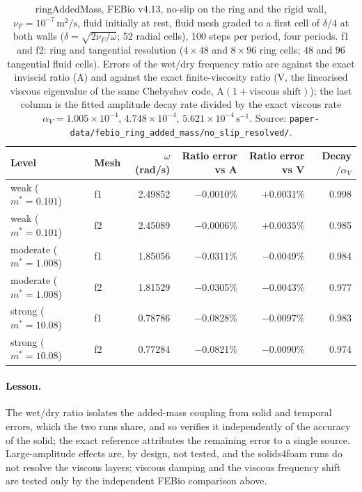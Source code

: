 \begin{table}[htbp]
	\centering
	\small
	\setlength{\tabcolsep}{4pt}
	\caption{ringAddedMass, FEBio v4.13, no-slip on the ring and the rigid wall, $\nu_F=10^{-7}\,\mathrm{m^2/s}$, fluid initially at rest, fluid mesh graded to a first cell of $\delta/4$ at both walls ($\delta=\sqrt{2\nu_F/\omega}$; 52 radial cells), 100 steps per period, four periods. f1 and f2: ring and tangential resolution ($4\times48$ and $8\times96$ ring cells; $48$ and $96$ tangential fluid cells). Errors of the wet/dry frequency ratio are against the exact inviscid ratio (A) and against the exact finite-viscosity ratio (V, the linearised viscous eigenvalue of the same Chebyshev code, $\mathrm{A}(1+\text{viscous shift})$); the last column is the fitted amplitude decay rate divided by the exact viscous rate $\alpha_V=1.005\times10^{-4}$, $4.748\times10^{-4}$, $5.621\times10^{-4}\,\mathrm{s^{-1}}$. Source: \texttt{paper-data/febio\_ring\_added\_mass/no\_slip\_resolved/}.}
	\label{tab:ring_febio}
	\begin{tabular}{llrrrr}
		\toprule
		Level & Mesh & $\omega$ (rad/s) & Ratio error vs A & Ratio error vs V & Decay$/\alpha_V$ \\
		\midrule
		weak ($m^*=0.101$) & f1 & 2.49852 & $-$0.0010\% & $+0.0031$\% & 0.998 \\
		weak ($m^*=0.101$) & f2 & 2.45089 & $-$0.0006\% & $+0.0035$\% & 0.985 \\
		moderate ($m^*=1.008$) & f1 & 1.85056 & $-$0.0311\% & $-$0.0049\% & 0.984 \\
		moderate ($m^*=1.008$) & f2 & 1.81529 & $-$0.0305\% & $-$0.0043\% & 0.977 \\
		strong ($m^*=10.08$) & f1 & 0.78786 & $-$0.0828\% & $-$0.0097\% & 0.983 \\
		strong ($m^*=10.08$) & f2 & 0.77284 & $-$0.0821\% & $-$0.0090\% & 0.974 \\
		\bottomrule
	\end{tabular}
\end{table}

\paragraph{Lesson.}
The wet/dry ratio isolates the added-mass coupling from solid and temporal errors, which the two runs share, and so verifies it independently of the accuracy of the solid; the exact reference attributes the remaining error to a single source.
Large-amplitude effects are, by design, not tested, and the solids4foam runs do not resolve the viscous layers; viscous damping and the viscous frequency shift are tested only by the independent FEBio comparison above.

